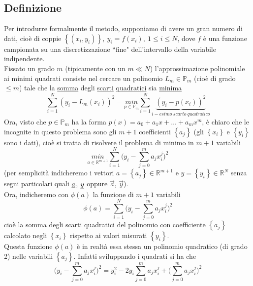 \subsection{Definizione}
Per introdurre formalmente il metodo, supponiamo di avere un gran numero di dati, cioè di coppie $\left\{ (x_i,y_i) \right\}, \ y_i = f(x_i), \ 1 \leq i \leq N$,
dove $f$ è una funzione campionata su una discretizzazione ``fine" dell'intervallo della variabile indipendente. \\
Fissato un grado $m$ (tipicamente con un $m \ll N$) l'approssimazione polinomiale ai minimi quadrati consiste nel cercare un polinomio $L_m \in \mathbb{P}_m$ (cioè di grado $\leq m$) tale che la \uline{somma} degli \uline{scarti} \uline{quadratici} sia \uline{minima}
\begin{equation*}
    \sum_{i=1}^N (y_i - L_m(x_i))^2 = \underset{p \in \mathbb{P}_m}{min} \sum_{i=1}^N \underbrace{(y_i - p(x_i))^2}_{i-esimo \ scarto \ quadratico}
\end{equation*}
Ora, visto che $p \in \mathbb{P}_m$ ha la forma
$p(x) = a_0 + a_1x + \dots + a_mx^m$, è chiaro che le incognite in questo problema sono gli $m+1$ coefficienti $\left\{ a_j \right\}$ (gli $\left\{ x_i \right\}$ e $\left\{ y_i \right\}$ sono i dati), cioè si tratta di risolvere il problema di minimo in $m+1$ variabili
\begin{equation*}
    \underset{a \in \mathbb{R}^{m+1}}{min}\sum_{i=1}^N \biggl( y_i - \sum_{j=0}^m a_j x_i^j \biggr) ^2
\end{equation*}
(per semplicità indicheremo i vettori $a = \left\{ a_j \right\} \in \mathbb{R}^{m+1}$ e $y = \left\{ y_i \right\} \in \mathbb{R}^{N}$ senza segni particolari quali $\uline{a}$, $\uline{y}$ oppure $\Vec{a}$, $\Vec{y}$). \\
Ora, indicheremo con $\phi(a)$ la funzione di $m+1$ variabili 
\begin{equation*}
    \phi(a) = \sum_{i=1}^N \biggl( y_i - \sum_{j=0}^m a_j x_i^j \biggr) ^2
\end{equation*}
cioè la somma degli scarti quadratici del polinomio con coefficiente $\left\{ a_j \right\}$ calcolato negli $\left\{ x_i \right\}$ rispetto ai valori misurati $\left\{ y_i \right\}$. \\
Questa funzione $\phi(a)$ è in realtà essa stessa un polinomio quadratico (di grado 2) nelle variabili $\left\{ a_j \right\}$. Infatti sviluppando i quadrati si ha che
\begin{equation*}
    \biggl( y_i - \sum_{j=0}^m a_j x_i^j \biggr)^2 = y_i^2 - 2y_i\sum_{j=0}^m a_j x_i^j + \biggl( \sum_{j=0}^m a_j x_i^j \biggr)^2
\end{equation*}
